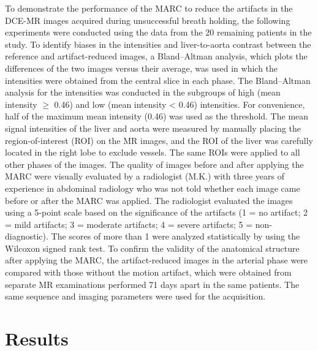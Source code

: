 \documentclass[num-refs]{wiley-article}
\begin{document}
To demonstrate the performance of the MARC to reduce the artifacts in the DCE-MR images acquired during unsuccessful breath holding, the following experiments were conducted using the data from the 20 remaining patients in the study. To identify biases in the intensities and liver-to-aorta contrast between the reference and artifact-reduced images, a Bland–Altman analysis, which plots the differences of the two images versus their average, was used in which the intensities were obtained from the central slice in each phase. The Bland–Altman analysis for the intensities was conducted in the subgroups of high (mean intensity $\geq$ 0.46) and low (mean intensity < 0.46) intensities. For convenience, half of the maximum mean intensity (0.46) was used as the threshold. The mean signal intensities of the liver and aorta were measured by manually placing the region-of-interest (ROI) on the MR images, and the ROI of the liver was carefully located in the right lobe to exclude vessels. The same ROIs were applied to all other phases of the images. The quality of images before and after applying the MARC were visually evaluated by a radiologist (M.K.) with three years of experience in abdominal radiology who was not told whether each image came before or after the MARC was applied. The radiologist evaluated the images using a 5-point scale based on the significance of the artifacts (1 = no artifact; 2 = mild artifacts; 3 = moderate artifacts; 4 = severe artifacts; 5 = non-diagnostic). The scores of more than 1 were analyzed statistically by using the Wilcoxon signed rank test. To confirm the validity of the anatomical structure after applying the MARC, the artifact-reduced images in the arterial phase were compared with those without the motion artifact, which were obtained from separate MR examinations performed 71 days apart in the same patients. The same sequence and imaging parameters were used for the acquisition.


\section{Results}
\end{document}
